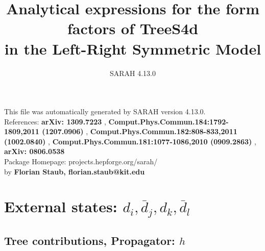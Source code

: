 \documentclass[A4,landscape]{article}
\begin{document}
\title{Analytical expressions for the form factors of TreeS4d\\ in the Left-Right Symmetric Model } 
 \author{SARAH 4.13.0} 
 \maketitle 
 \vspace{10cm} 
This file was automatically generated by SARAH version 4.13.0.  \\ 
References: {\bf arXiv: 1309.7223 }, {\bf Comput.Phys.Commun.184:1792-1809,2011 (1207.0906) }, {\bf Comput.Phys.Commun.182:808-833,2011 (1002.0840) }, {\bf Comput.Phys.Commun.181:1077-1086,2010 (0909.2863) }, {\bf arXiv: 0806.0538 } \\ 
Package Homepage: projects.hepforge.org/sarah/ \\ 
by {\bf Florian Staub, florian.staub@kit.edu} 
 \pagebreak 
 \tableofcontents 
 \pagebreak 
\section{External states: ${d_{{i}}, \bar{d}_{{j}}, d_{{k}}, \bar{d}_{{l}}}$} 
\subsection{Tree contributions, Propagator: $h$} 
\end{document}

